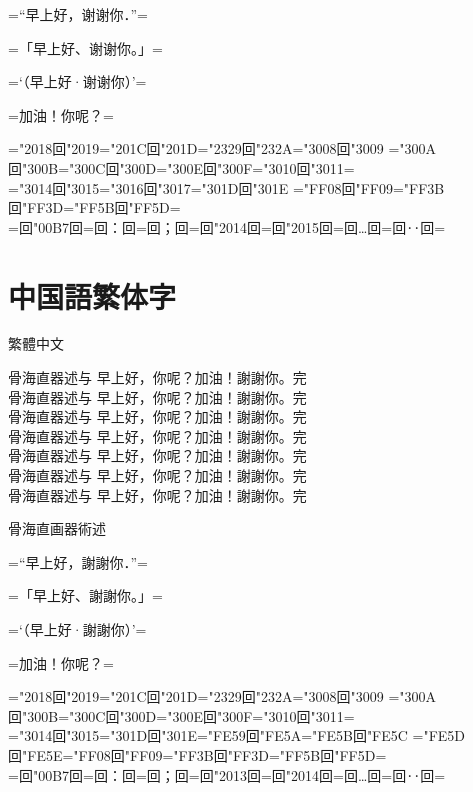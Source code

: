 \documentclass[landscape]{utarticle}
\begin{document}
\upschrmm
=“早上好，谢谢你．”=

=「早上好、谢谢你。」=

=‘（早上好·谢谢你）’=

=加油！你呢？=

=\kchar"2018回\kchar"2019=\kchar"201C回\kchar"201D=\kchar"2329回\kchar"232A=\kchar"3008回\kchar"3009%
=\kchar"300A回\kchar"300B=\kchar"300C回\kchar"300D=\kchar"300E回\kchar"300F=\kchar"3010回\kchar"3011=\\
=\kchar"3014回\kchar"3015=\kchar"3016回\kchar"3017=\kchar"301D回\kchar"301E%
=\kchar"FF08回\kchar"FF09=\kchar"FF3B回\kchar"FF3D=\kchar"FF5B回\kchar"FF5D=\\
=回\kchar"00B7回=回：回=回；回=回\kchar"2014回=回\kchar"2015回=回…回=回‥回=


\newpage

\section{中国語繁体字}
\upschgtb 繁體中文

\uptchrml 骨海直器述与 早上好，你呢？加油！謝謝你。完\\
\uptchrmm 骨海直器述与 早上好，你呢？加油！謝謝你。完\\
\uptchrmb 骨海直器述与 早上好，你呢？加油！謝謝你。完\\
\uptchgtm 骨海直器述与 早上好，你呢？加油！謝謝你。完\\
\uptchgtb 骨海直器述与 早上好，你呢？加油！謝謝你。完\\
\uptchgte 骨海直器述与 早上好，你呢？加油！謝謝你。完\\
\uptchgth 骨海直器述与 早上好，你呢？加油！謝謝你。完\\

\uptchrmm

骨海直画器術述

=“早上好，謝謝你．”=

=「早上好、謝謝你。」=

=‘（早上好·謝謝你）’=

=加油！你呢？=

=\kchar"2018回\kchar"2019=\kchar"201C回\kchar"201D=\kchar"2329回\kchar"232A=\kchar"3008回\kchar"3009%
=\kchar"300A回\kchar"300B=\kchar"300C回\kchar"300D=\kchar"300E回\kchar"300F=\kchar"3010回\kchar"3011=\\
=\kchar"3014回\kchar"3015=\kchar"301D回\kchar"301E=\kchar"FE59回\kchar"FE5A=\kchar"FE5B回\kchar"FE5C%
=\kchar"FE5D回\kchar"FE5E=\kchar"FF08回\kchar"FF09=\kchar"FF3B回\kchar"FF3D=\kchar"FF5B回\kchar"FF5D=\\
=回\kchar"00B7回=回：回=回；回=回\kchar"2013回=回\kchar"2014回=回…回=回‥回=
\end{document}
